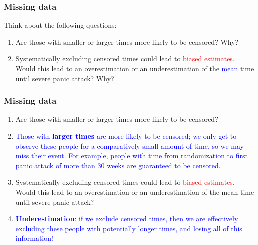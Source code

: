 \documentclass[10pt,t]{beamer}
\begin{document}
\begin{frame}
\frametitle{Missing data}
Think about the following questions:

\medskip

\begin{enumerate}
\item Are those with smaller or larger times more likely to be censored? Why?  

\medskip

\item Systematically excluding censored times could lead to \textcolor{red}{biased estimates}. Would this lead to an overestimation or an underestimation of the \textcolor{blue}{mean} time until severe panic attack? Why?
\end{enumerate}

\end{frame}

\begin{frame}
\frametitle{Missing data}

\vspace{-5 mm}

\begin{enumerate}
\item Are those with smaller or larger times more likely to be censored? 
\medskip

\item[] \textcolor{blue}{Those with \textbf{larger times} are more likely to be censored; we only get to observe these people for a comparatively small amount of time, so we may miss their event. For example, people with time from randomization to first panic attack of more than 30 weeks are guaranteed to be censored.}  

\medskip

\item Systematically excluding censored times could lead to \textcolor{red}{biased estimates}. Would this lead to an overestimation or an underestimation of the mean time until severe panic attack?

\medskip

\item[] \textcolor{blue}{\textbf{Underestimation}: if we exclude censored times, then we are effectively excluding these people with potentially longer times, and losing all of this information!}
\end{enumerate}

\end{frame}
\end{document}
